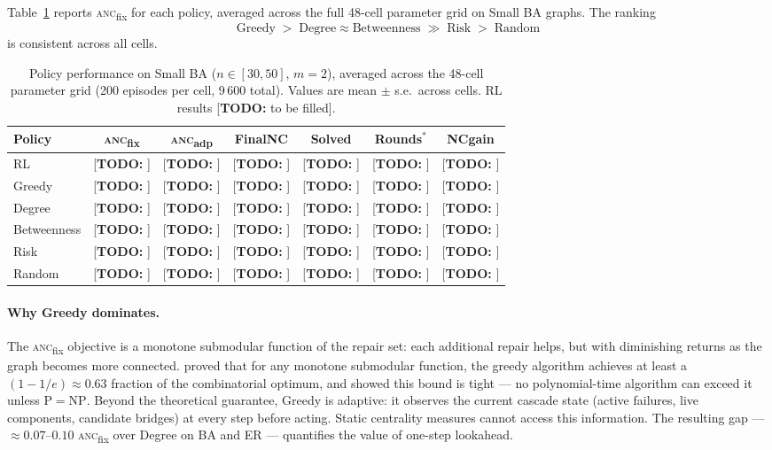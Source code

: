 \documentclass[11pt]{article}
\newcommand{\anc}{\textsc{anc}}
\newcommand{\ancfix}{\anc{}\textsubscript{fix}}
\newcommand{\ancadp}{\anc{}\textsubscript{adp}}
\newcommand{\todo}[1]{\textcolor{red!70!black}{[\textbf{TODO:} #1]}}
\begin{document}
Table~\ref{tab:heuristic_ordering} reports \ancfix{} for each policy,
averaged across the full 48-cell parameter grid on Small BA graphs.
The ranking
\[
  \text{Greedy} \;>\; \text{Degree} \approx \text{Betweenness}
  \;\gg\; \text{Risk} \;>\; \text{Random}
\]
is consistent across all cells.

\begin{table}[htbp]
\centering
\caption{Policy performance on Small BA ($n\!\in\![30,50]$, $m=2$),
         averaged across the 48-cell parameter grid
         (200 episodes per cell, 9\,600 total).
         Values are mean $\pm$ s.e.\ across cells.
         RL results \todo{to be filled}.}
\label{tab:heuristic_ordering}
\setlength{\tabcolsep}{6pt}
\begin{tabular}{lcccccc}
\toprule
Policy      & \ancfix{}         & \ancadp{}   & FinalNC     & Solved      & Rounds$^{*}$ & NCgain \\
\midrule
RL          & \todo{}           & \todo{}     & \todo{}     & \todo{}     & \todo{}      & \todo{} \\
Greedy      & \todo{}           & \todo{}     & \todo{}     & \todo{}     & \todo{}      & \todo{} \\
Degree      & \todo{}           & \todo{}     & \todo{}     & \todo{}     & \todo{}      & \todo{} \\
Betweenness & \todo{}           & \todo{}     & \todo{}     & \todo{}     & \todo{}      & \todo{} \\
Risk        & \todo{}           & \todo{}     & \todo{}     & \todo{}     & \todo{}      & \todo{} \\
Random      & \todo{}           & \todo{}     & \todo{}     & \todo{}     & \todo{}      & \todo{} \\
\bottomrule
\end{tabular}
\end{table}


\paragraph{Why Greedy dominates.}
The \ancfix{} objective is a monotone submodular function of the repair
set: each additional repair helps, but with diminishing returns as the
graph becomes more connected.
\citet{nemhauser1978analysis} proved that for any monotone submodular
function, the greedy algorithm achieves at least a
$(1-1/e)\approx 0.63$ fraction of the combinatorial optimum, and
\citet{feige1998threshold} showed this bound is tight — no polynomial-time
algorithm can exceed it unless $\mathrm{P}=\mathrm{NP}$.
Beyond the theoretical guarantee, Greedy is adaptive: it observes the
current cascade state (active failures, live components, candidate
bridges) at every step before acting.
Static centrality measures cannot access this information.
The resulting gap — $\approx\!0.07$--$0.10$ \ancfix{} over Degree on BA
and ER — quantifies the value of one-step lookahead.
\end{document}
